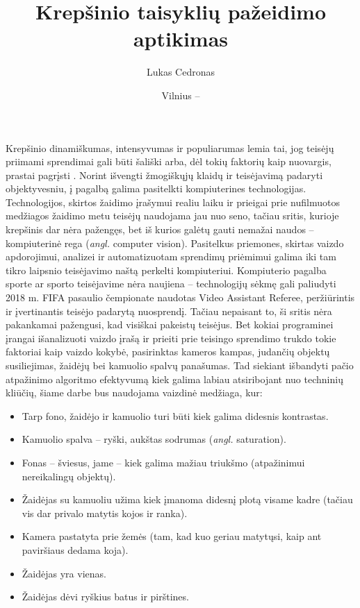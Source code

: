 \documentclass{VUMIFPSkursinis}
\title{Krepšinio taisyklių pažeidimo aptikimas}
\author{Lukas Cedronas}
\date{Vilnius – \the\year}
\begin{document}
\maketitle

\tableofcontents

Krepšinio dinamiškumas, intensyvumas ir populiarumas lemia tai, jog teisėjų priimami sprendimai gali būti šališki \cite{ProfitableBias} arba, dėl tokių faktorių kaip nuovargis, prastai pagrįsti \cite{MissedCalls}. Norint išvengti žmogiškųjų klaidų ir teisėjavimą padaryti objektyvesniu, į pagalbą galima pasitelkti kompiuterines technologijas. Technologijos, skirtos žaidimo įrašymui realiu laiku ir prieigai prie nufilmuotos medžiagos žaidimo metu teisėjų naudojama jau nuo seno, tačiau sritis, kurioje krepšinis dar nėra pažengęs, bet iš kurios galėtų gauti nemažai naudos – kompiuterinė rega (\textit{angl.} computer vision). Pasitelkus priemones, skirtas vaizdo apdorojimui, analizei ir automatizuotam sprendimų priėmimui galima iki tam tikro laipsnio teisėjavimo naštą perkelti kompiuteriui. Kompiuterio pagalba sporte ar sporto teisėjavime nėra naujiena – technologijų sėkmę gali paliudyti  2018 m. FIFA pasaulio čempionate naudotas Video Assistant Referee, peržiūrintis ir įvertinantis teisėjo padarytą nuosprendį. Tačiau nepaisant to, ši sritis nėra pakankamai pažengusi, kad visiškai pakeistų teisėjus. Bet kokiai programinei įrangai išanalizuoti vaizdo įrašą ir prieiti prie teisingo sprendimo trukdo tokie faktoriai kaip vaizdo kokybė, pasirinktas kameros kampas, judančių objektų susiliejimas, žaidėjų bei kamuolio spalvų panašumas. Tad siekiant išbandyti pačio atpažinimo algoritmo efektyvumą kiek galima labiau atsiribojant nuo techninių kliūčių, šiame darbe bus naudojama vaizdinė medžiaga, kur:
\begin{itemize}
 \item Tarp fono, žaidėjo ir kamuolio turi būti kiek galima didesnis kontrastas.
 \item Kamuolio spalva – ryški, aukštas sodrumas (\textit{angl.} saturation).
 \item Fonas – šviesus, jame – kiek galima mažiau triukšmo (atpažinimui nereikalingų objektų).
 \item Žaidėjas su kamuoliu užima kiek įmanoma didesnį plotą visame kadre (tačiau vis dar privalo matytis kojos ir ranka).
 \item Kamera pastatyta prie žemės (tam, kad kuo geriau matytųsi, kaip ant paviršiaus dedama koja).
 \item Žaidėjas yra vienas.
 \item Žaidėjas dėvi ryškius batus ir pirštines.
\end{itemize}
\end{document}
